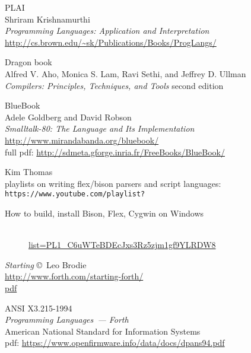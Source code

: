 \begin{thebibliography}{99}

 PLAI\\
Shriram Krishnamurthi\\
\emph{Programming Languages: Application and Interpretation}\\
\url{http://cs.brown.edu/~sk/Publications/Books/ProgLangs/}

 Dragon book\\
Alfred V. Aho, Monica S. Lam, Ravi Sethi, and Jeffrey D. Ullman\\
\emph{Compilers: Principles, Techniques, and Tools} second edition

 BlueBook\\
Adele Goldberg and David Robson\\
\emph{Smalltalk-80: The Language and Its Implementation}\\
\url{http://www.mirandabanda.org/bluebook/}\\
full pdf: \url{http://sdmeta.gforge.inria.fr/FreeBooks/BlueBook/}

Kim Thomas\\playlists on writing flex/bison parsers and script languages:\\
\verb|https://www.youtube.com/playlist?|\\
\begin{description}
\item[How to build, install Bison, Flex, Cygwin on Windows]\ \\
\href{https://www.youtube.com/playlist?list=PL1\_C6uWTeBDEcJxs3Rz5zjm1gf9YLRDW8}{list=PL1\_C6uWTeBDEcJxs3Rz5zjm1gf9YLRDW8}
\item[]
\end{description}

 \emph{Starting \F} \copyright\ Leo Brodie\\
\url{http://www.forth.com/starting-forth/}\\
\href{ftp://ftp.apple.asimov.net/pub/apple_II/documentation/programming/forth/Starting%20Forth.pdf}{pdf}

 ANSI X3.215-1994\\
\emph{Programming Languages\ --- Forth}\\
American National Standard for Information Systems\\
pdf: \url{https://www.openfirmware.info/data/docs/dpans94.pdf}


\end{thebibliography}
